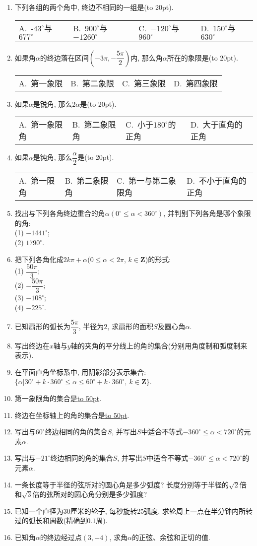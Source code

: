 \documentclass[10pt,a4paper]{article}
\newcommand{\blank}[1]{\underline{\hbox to #1pt{}}}
\newcommand{\bracket}[1]{(\hbox to #1pt{})}
\newcommand{\fourch}[4]{\par\begin{tabular}{p{.23\textwidth}p{.23\textwidth}p{.23\textwidth}p{.23\textwidth}}
A.~#1 &B.~#2& C.~#3& D.~#4
\end{tabular}}
\begin{document}
\begin{enumerate}[1.]
\item 下列各组的两个角中, 终边不相同的一组是\bracket{20}.
\fourch{-$43^\circ$与$677^\circ$}{$900^\circ$与$-1260^\circ$}{$-120^\circ$与$960^\circ$}{$150^\circ$与$630^\circ$}
\item 如果角$\alpha$的终边落在区间$(-3\pi ,-\dfrac{5\pi}2)$内, 那么角$\alpha$所在的象限是\bracket{20}.
\fourch{第一象限}{第二象限}{第三象限}{第四象限}
\item 如果$\alpha$是锐角, 那么$2\alpha$是\bracket{20}.
\fourch{第一象限角}{第二象限角}{小于$180^\circ$的正角}{大于直角的正角}
\item 如果$\alpha$是钝角, 那么$\dfrac{\alpha}2$是\bracket{20}.
\fourch{第一限角}{第二象限角}{第一与第二象限角}{不小于直角的正角}
\item 找出与下列各角终边重合的角$\alpha (0^\circ\le \alpha <360^\circ)$, 并判别下列各角是哪个象限的角:\\
(1) $-1441^\circ$;\\
(2) $1790^\circ$.
\item 把下列各角化成$2k\pi +\alpha$($0\le \alpha <2\pi$, $k\in \mathbf{Z}$)的形式:\\
(1) $\dfrac{50\pi}3$;\\
(2) $-\dfrac{50\pi}3$;\\
(3) $-108^\circ$;\\
(4) $-225^\circ$.
\item 已知扇形的弧长为$\dfrac{5\pi}3$, 半径为$2$, 求扇形的面积$S$及圆心角$\alpha$.
\item 写出终边在$x$轴与$y$轴的夹角的平分线上的角的集合(分别用角度制和弧度制来表示).
\item 在平面直角坐标系中, 用阴影部分表示集合: $\{\alpha|30^\circ+k\cdot 360^\circ\le \alpha \le 60^\circ+k\cdot 360^\circ, \ k\in \mathbf{Z}\}$.
\item 第一象限角的集合是\blank{50}.
\item 终边在坐标轴上的角的集合是\blank{50}.
\item 写出与$60^\circ$终边相同的角的集合$S$, 并写出$S$中适合不等式$-360^\circ\le \alpha <720^\circ$的元素$\alpha$.
\item 写出与$-21^\circ$终边相同的角的集合$S$, 并写出$S$中适合不等式$-360^\circ\le \alpha <720^\circ$的元素$\alpha$.
\item 一条长度等于半径的弦所对的圆心角是多少弧度? 长度分别等于半径的$\sqrt 2$倍和$\sqrt 3$倍的弦所对的圆心角分别是多少弧度?
\item 已知一个直径为$30$厘米的轮子, 每秒旋转$25$弧度, 求轮周上一点在半分钟内所转过的弧长和周数(精确到$0.1$周).
\item 已知角$\alpha$的终边经过点$(3,-4)$, 求角$\alpha$的正弦、余弦和正切的值.

\end{enumerate}
\end{document}
